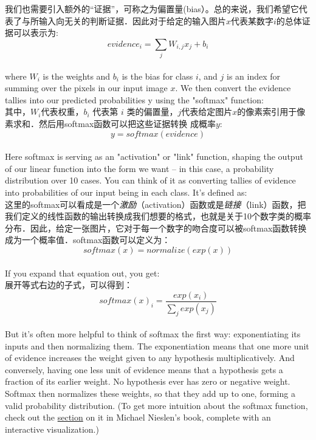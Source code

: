 我们也需要引入额外的“证据”，可称之为偏置量(bias）。总的来说，我们希望它代表了与所输入向无关的判断证据．因此对于给定的输入图片$x$代表某数字$i$的总体证据可以表示为:
\begin{equation}
evidence_i = \sum_j{W_{i,j}}x_j+b_i
\end{equation}\\
where $W_i$ is the weights and $b_i$ is the bias for class $i$, and $j$ is an index for summing over the pixels in our input image $x$. We then convert the evidence tallies into our predicted probabilities y using the "softmax" function:\\
其中，$W_i$代表权重，$b_i$ 代表第 $i$ 类的偏置量，$j$代表给定图片$x$的像素索引用于像素求和．然后用softmax函数可以把这些证据转换
成概率$y$:\\
\begin{equation}
y = softmax(evidence)
\end{equation}\\
Here softmax is serving as an "activation" or "link" function, shaping the output of our linear function into the form we want -- in this case, a probability distribution over 10 cases. You can think of it as converting tallies of evidence into probabilities of our input being in each class. It's defined as:\\
这里的softmax可以看成是一个\emph{激励}（activation）函数或是\emph{链接}（link）函数，把我们定义的线性函数的输出转换成我们想要的格式，也就是关于10个数字类的概率分布．因此，给定一张图片，它对于每一个数字的吻合度可以被softmax函数转换成为一个概率值．softmax函数可以定义为：\\
\begin{equation}
softmax(x) = normalize(exp(x))
\end{equation}\\
If you expand that equation out, you get:\\
展开等式右边的子式，可以得到：\\
\begin{equation}
softmax(x)_i = \frac{exp(x_i)}{\sum_j{exp(x_j)}}
\end{equation}\\
But it's often more helpful to think of softmax the first way: exponentiating its inputs and then normalizing them. The exponentiation means that one more unit of evidence increases the weight given to any hypothesis multiplicatively. And conversely, having one less unit of evidence means that a hypothesis gets a fraction of its earlier weight. No hypothesis ever has zero or negative weight. Softmax then normalizes these weights, so that they add up to one, forming a valid probability distribution. (To get more intuition about the softmax function, check out the \href{http://neuralnetworksanddeeplearning.com/chap3.html#softmax}{section} on it in Michael Nieslen's book, complete with an interactive visualization.)\\
